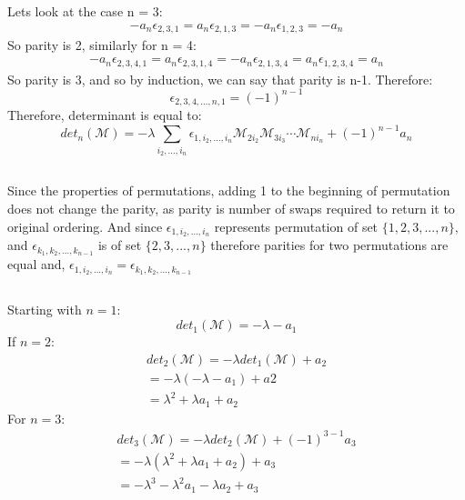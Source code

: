 \documentclass[12pt]{article}
\begin{document}
\subsection{}
Lets look at the case n = 3:
\begin{equation}
    \begin{gathered}
        -a_n\epsilon_{2,3,1} = a_n\epsilon_{2,1,3} = -a_n\epsilon_{1,2,3} = -a_n 
    \end{gathered}
\end{equation}
So parity is 2, similarly for n = 4:
\begin{equation}
    \begin{gathered}
        -a_n\epsilon_{2,3,4,1} = a_n\epsilon_{2,3,1,4} = -a_n\epsilon_{2,1,3,4} = a_n\epsilon_{1,2,3,4} = a_n
    \end{gathered}
\end{equation} 
So parity is 3, and so by induction, we can say that parity is n-1. Therefore:
\begin{equation}
    \epsilon_{2,3,4,...,n,1}  = (-1)^{n-1}
\end{equation}
Therefore, determinant is equal to:
\begin{equation}
    det_n(\mathcal{M}) = -\lambda\sum_{i_2,...,i_n}\epsilon_{1,i_2,...,i_n}\mathcal{M}_{2i_2}\mathcal{M}_{3i_3}\cdots\mathcal{M}_{ni_n} + (-1)^{n-1}a_n
\end{equation}
\subsection{}
Since the properties of permutations, adding 1 to the beginning of permutation does not change the parity, as parity is number of swaps required to return it to original ordering. And since $\epsilon_{1,i_2,...,i_n}$ represents permutation of set $\{1,2,3,...,n\}$, and $\epsilon_{k_1,k_2,...,k_{n-1}}$ is of set $\{2,3,...,n\}$
therefore parities for two permutations are equal and, $\epsilon_{1,i_2,...,i_n} = \epsilon_{k_1,k_2,...,k_{n-1}}$
\subsection{}
Starting with $n=1$:
\begin{equation}
    det_1(\mathcal{M}) = -\lambda - a_1
\end{equation}
If $n=2$:
\begin{equation}
\begin{gathered}
    det_2(\mathcal{M}) = -\lambda det_1(\mathcal{M}) + a_2 \\=-\lambda(-\lambda - a_1) + a2 \\ = \lambda^2 + \lambda a_1 + a_2
\end{gathered}
\end{equation}
For $n=3$:
\begin{equation}
\begin{gathered}
    det_3(\mathcal{M}) = -\lambda det_2(\mathcal{M}) + (-1)^{3-1}a_3 \\ = -\lambda(\lambda^2 + \lambda a_1 + a_2) + a_3 \\ = -\lambda^3 - \lambda^2 a_1 - \lambda a_2 + a_3
\end{gathered}
\end{equation}
\end{document}
